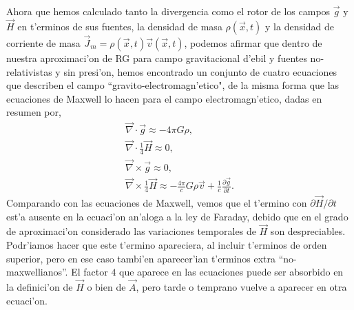 Ahora que hemos calculado tanto la divergencia como el rotor de los campos $\vec{g}$ y $\vec{H}$ en t'erminos de sus fuentes, la densidad de masa $\rho (\vec{x},t)$ y la densidad de corriente de masa $\vec{J}_m=\rho (\vec{x},t)\vec{v}(\vec{x},t)$, podemos afirmar que dentro de nuestra aproximaci'on de RG para campo gravitacional d'ebil y fuentes no-relativistas y sin presi'on, hemos encontrado un conjunto de cuatro ecuaciones que describen el campo ``gravito-electromagn'etico", de la misma forma que las ecuaciones de Maxwell lo hacen para el campo electromagn'etico, dadas en resumen por,
\begin{gather}
\vec{\nabla}\cdot\vec{g}\approx -4\pi G\rho ,\\
\vec{\nabla}\cdot\frac{1}{4}\vec{H}\approx 0,\\
\vec{\nabla}\times\vec{g}\approx 0,\\
\vec{\nabla}\times\frac{1}{4}\vec{H}\approx -\frac{4\pi}{c}G\rho \vec{v}+\frac{1}{c}\frac{\partial \vec{g}}{\partial t}.
\end{gather}
Comparando con las ecuaciones de Maxwell, vemos que el t'ermino con $\partial \vec{H}/\partial t$ est'a ausente en la ecuaci'on an'aloga a la ley de Faraday, debido que en el grado de aproximaci'on considerado las variaciones temporales de $\vec{H}$ son despreciables. Podr'iamos hacer que este t'ermino apareciera, al incluir t'erminos de orden superior, pero en ese caso tambi'en aparecer'ian t'erminos extra ``no-maxwellianos''. El factor $4$ que aparece en las ecuaciones puede ser absorbido en la definici'on de $\vec{H}$ o bien de $\vec{A}$, pero tarde o temprano vuelve a aparecer en otra ecuaci'on.


